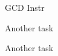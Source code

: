 
\section[{\it Hands-On} GCD Instr]{}

\begin{frame}{GCD Instr}
\end{frame}

\begin{task}
\begin{frame}{Another task}

\end{frame}
\end{task}

\begin{task}
\begin{frame}{Another task}

\end{frame}
\end{task}

